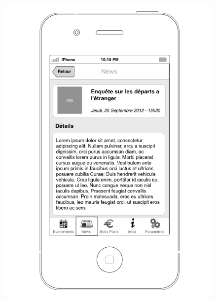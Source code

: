 \documentclass[a4paper, 11px]{article}
\begin{document}
\begin{figure}[htbp]
\begin{minipage}[c]{.50\linewidth}
\begin{center}
			\includegraphics[scale=0.3]{../../Sketch/iOS/news_detail.png}
		\end{center}
	\end{minipage}
\end{figure}
\end{document}
